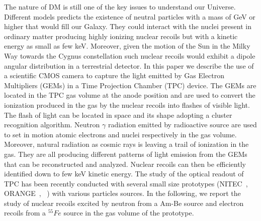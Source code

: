 \documentclass[12pt]{iopart}
\begin{document}
The nature of DM is still one of the key  issues to understand  our Universe. Different models  predicts the existence of neutral particles with a mass of GeV  or higher that would fill our Galaxy. They  could interact with the nuclei present in ordinary matter producing highly ionizing nuclear recoils but with a  kinetic energy as small as  few keV. Moreover, given the motion of the Sun in the Milky Way towards the Cygnus constellation such nuclear recoils would exhibit a dipole angular distribution in a terrestrial detector.
In this paper we describe the use of a scientific CMOS camera to capture the light emitted by Gas Electron Multipliers (GEMs) in a Time Projection Chamber (TPC) device. The GEMs are located in the TPC gas volume at the anode position and are used to convert the ionization produced in the gas by   the  nuclear recoils into flashes of visible light. The flash of light can be located in space and its shape adopting a cluster  recognition algorithm. Neutron $\gamma$ radiation emitted by radioactive source are used to  set in motion  atomic electrons and nuclei respectively in the gas volume. Moreover, natural radiation as cosmic rays is leaving a trail of ionization in the gas. They are all producing different  patterns of light emission from the GEMs that can be reconstructed and analyzed. Nuclear recoils can then be efficiently identified down to few keV kinetic energy. 
 The study of the optical readout of TPC has been recently conducted with several small size prototypes (NITEC~\cite{JINST:nitec}, ORANGE~\cite{NIM:Marafinietal, bib:jinst_orange2}, \lemon~\cite{bib:eps, bib:ieee17, bib:elba}) with various particles sources. In the following, we report the study of nuclear recoils excited by neutron from a  Am-Be source and electron recoils from a $^{55}Fe$ source in the gas volume of the  \lemon prototype.
\end{document}
